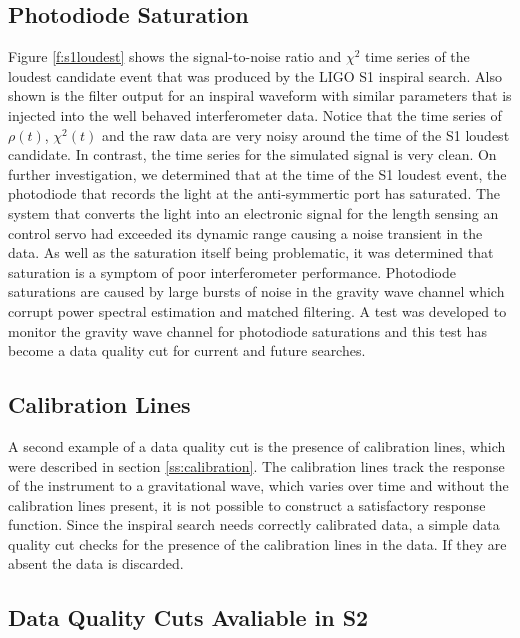 \subsection{Photodiode Saturation}
\label{ss:photodiode}

Figure \ref{f:s1loudest} shows the signal-to-noise ratio and $\chi^2$ time
series of the loudest candidate event that was produced by the LIGO S1
inspiral search. Also shown is the filter output for an inspiral waveform with
similar parameters that is injected into the well behaved interferometer data.
Notice that the time series of $\rho(t)$, $\chi^2(t)$ and the raw data are
very noisy around the time of the S1 loudest candidate. In contrast, the time
series for the simulated signal is very clean. On further investigation, we
determined that at the time of the S1 loudest event, the photodiode that
records the light at the anti-symmertic port has saturated. The system that
converts the light into an electronic signal for the length sensing an control
servo had exceeded its dynamic range causing a noise transient in the data.
As well as the saturation itself being problematic, it was determined that
saturation is a symptom of poor interferometer performance. Photodiode
saturations are caused by large bursts of noise in the gravity wave channel
which corrupt power spectral estimation and matched filtering. A test was
developed to monitor the gravity wave channel for photodiode saturations and
this test has become a data quality cut for current and future searches.

\subsection{Calibration Lines}
\label{ss:calcut}

A second example of a data quality cut is the presence of calibration lines,
which were described in section \ref{ss:calibration}. The calibration lines
track the response of the instrument to a gravitational wave, which varies
over time and without the calibration lines present, it is not possible to
construct a satisfactory response function. Since the inspiral search needs
correctly calibrated data, a simple data quality cut checks for the presence
of the calibration lines in the data. If they are absent the data is
discarded.

\subsection{Data Quality Cuts Avaliable in S2}
\label{ss:s2dq}


